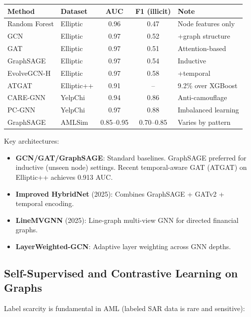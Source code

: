 \documentclass[11pt]{article}
\begin{document}
\begin{center}
\small
\begin{tabular}{llccl}
\toprule
\textbf{Method} & \textbf{Dataset} & \textbf{AUC} & \textbf{F1 (illicit)} & \textbf{Note} \\
\midrule
Random Forest & Elliptic & 0.96 & 0.47 & Node features only \\
GCN & Elliptic & 0.97 & 0.52 & +graph structure \\
GAT & Elliptic & 0.97 & 0.51 & Attention-based \\
GraphSAGE & Elliptic & 0.97 & 0.54 & Inductive \\
EvolveGCN-H & Elliptic & 0.97 & 0.58 & +temporal \\
ATGAT & Elliptic++ & 0.91 & -- & 9.2\% over XGBoost \\
CARE-GNN & YelpChi & 0.94 & 0.86 & Anti-camouflage \\
PC-GNN & YelpChi & 0.97 & 0.88 & Imbalanced learning \\
GraphSAGE & AMLSim & 0.85--0.95 & 0.70--0.85 & Varies by pattern \\
\bottomrule
\end{tabular}
\end{center}

Key architectures:
\begin{itemize}
\item \textbf{GCN/GAT/GraphSAGE}: Standard baselines. GraphSAGE preferred for inductive (unseen node) settings. Recent temporal-aware GAT (ATGAT) on Elliptic++ achieves 0.913 AUC.
\item \textbf{Improved HybridNet} (2025): Combines GraphSAGE + GATv2 + temporal encoding.
\item \textbf{LineMVGNN} (2025): Line-graph multi-view GNN for directed financial graphs.
\item \textbf{LayerWeighted-GCN}: Adaptive layer weighting across GNN depths.
\end{itemize}

\subsection{Self-Supervised and Contrastive Learning on Graphs}

Label scarcity is fundamental in AML (labeled SAR data is rare and sensitive):
\end{document}
